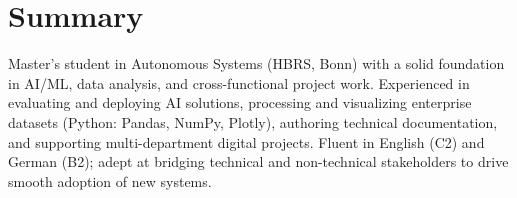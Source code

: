 \section{Summary}
Master's student in Autonomous Systems (HBRS, Bonn) with a solid foundation in AI/ML, data analysis, and cross-functional project work. Experienced in evaluating and deploying AI solutions, processing and visualizing enterprise datasets (Python: Pandas, NumPy, Plotly), authoring technical documentation, and supporting multi-department digital projects. Fluent in English (C2) and German (B2); adept at bridging technical and non-technical stakeholders to drive smooth adoption of new systems.
\vspace{-5pt}
